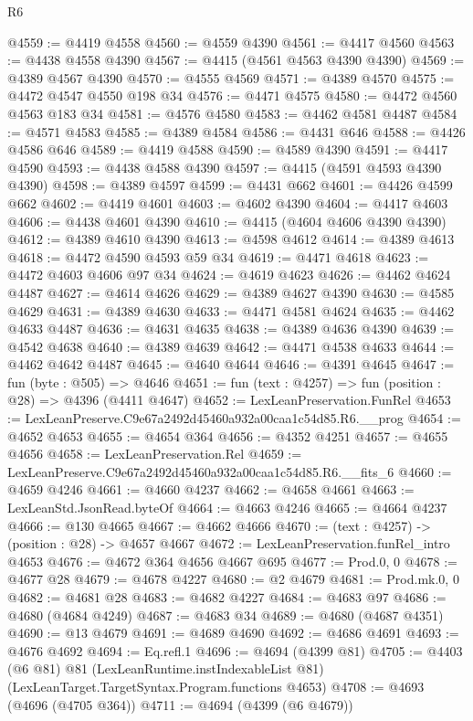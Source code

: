 \begin{lexlean}{R6}
\begin{coremodule}
@4559 := @4419 @4558
@4560 := @4559 @4390
@4561 := @4417 @4560
@4563 := @4438 @4558 @4390
@4567 := @4415 (@4561 @4563 @4390 @4390)
@4569 := @4389 @4567 @4390
@4570 := @4555 @4569
@4571 := @4389 @4570
@4575 := @4472 @4547 @4550 @198 @34
@4576 := @4471 @4575
@4580 := @4472 @4560 @4563 @183 @34
@4581 := @4576 @4580
@4583 := @4462 @4581 @4487
@4584 := @4571 @4583
@4585 := @4389 @4584
@4586 := @4431 @646
@4588 := @4426 @4586 @646
@4589 := @4419 @4588
@4590 := @4589 @4390
@4591 := @4417 @4590
@4593 := @4438 @4588 @4390
@4597 := @4415 (@4591 @4593 @4390 @4390)
@4598 := @4389 @4597
@4599 := @4431 @662
@4601 := @4426 @4599 @662
@4602 := @4419 @4601
@4603 := @4602 @4390
@4604 := @4417 @4603
@4606 := @4438 @4601 @4390
@4610 := @4415 (@4604 @4606 @4390 @4390)
@4612 := @4389 @4610 @4390
@4613 := @4598 @4612
@4614 := @4389 @4613
@4618 := @4472 @4590 @4593 @59 @34
@4619 := @4471 @4618
@4623 := @4472 @4603 @4606 @97 @34
@4624 := @4619 @4623
@4626 := @4462 @4624 @4487
@4627 := @4614 @4626
@4629 := @4389 @4627 @4390
@4630 := @4585 @4629
@4631 := @4389 @4630
@4633 := @4471 @4581 @4624
@4635 := @4462 @4633 @4487
@4636 := @4631 @4635
@4638 := @4389 @4636 @4390
@4639 := @4542 @4638
@4640 := @4389 @4639
@4642 := @4471 @4538 @4633
@4644 := @4462 @4642 @4487
@4645 := @4640 @4644
@4646 := @4391 @4645
@4647 := fun (byte : @505) => @4646
@4651 := fun (text : @4257) => fun (position : @28) => @4396 (@4411 @4647)
@4652 := LexLeanPreservation.FunRel
@4653 := LexLeanPreserve.C9e67a2492d45460a932a00caa1c54d85.R6.__prog
@4654 := @4652 @4653
@4655 := @4654 @364
@4656 := @4352 @4251
@4657 := @4655 @4656
@4658 := LexLeanPreservation.Rel
@4659 := LexLeanPreserve.C9e67a2492d45460a932a00caa1c54d85.R6.__fits_6
@4660 := @4659 @4246
@4661 := @4660 @4237
@4662 := @4658 @4661
@4663 := LexLeanStd.JsonRead.byteOf
@4664 := @4663 @4246
@4665 := @4664 @4237
@4666 := @130 @4665
@4667 := @4662 @4666
@4670 := (text : @4257) -> (position : @28) -> @4657 @4667
@4672 := LexLeanPreservation.funRel_intro @4653
@4676 := @4672 @364 @4656 @4667 @695
@4677 := Prod.{0, 0}
@4678 := @4677 @28
@4679 := @4678 @4227
@4680 := @2 @4679
@4681 := Prod.mk.{0, 0}
@4682 := @4681 @28
@4683 := @4682 @4227
@4684 := @4683 @97
@4686 := @4680 (@4684 @4249)
@4687 := @4683 @34
@4689 := @4680 (@4687 @4351)
@4690 := @13 @4679
@4691 := @4689 @4690
@4692 := @4686 @4691
@4693 := @4676 @4692
@4694 := Eq.refl.{1}
@4696 := @4694 (@4399 @81)
@4705 := @4403
    (@6 @81)
    @81
    (LexLeanRuntime.instIndexableList @81)
    (LexLeanTarget.TargetSyntax.Program.functions @4653)
@4708 := @4693 (@4696 (@4705 @364))
@4711 := @4694 (@4399 (@6 @4679))

\end{coremodule}
\end{lexlean}
